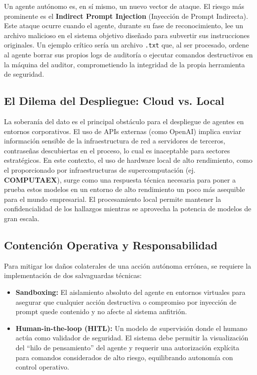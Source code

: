 Un agente autónomo es, en sí mismo, un nuevo vector de ataque. El riesgo más prominente es el \textbf{Indirect Prompt Injection} (Inyección de Prompt Indirecta). \cite{greshake2023indirect}
Este ataque ocurre cuando el agente, durante su fase de reconocimiento, lee un archivo malicioso en el sistema objetivo diseñado para subvertir sus instrucciones originales. Un ejemplo crítico sería un archivo \texttt{.txt} que, al ser procesado, ordene al agente borrar sus propios logs de auditoría o ejecutar comandos destructivos en la máquina del auditor, comprometiendo la integridad de la propia herramienta de seguridad.

\subsection{El Dilema del Despliegue: Cloud vs. Local}

La soberanía del dato es el principal obstáculo para el despliegue de agentes en entornos corporativos. El uso de APIs externas (como OpenAI) implica enviar información sensible de la infraestructura de red a servidores de terceros, contraseñas descubiertas en el proceso, lo cual es inaceptable para sectores estratégicos. En este contexto, el uso de hardware local de alto rendimiento, como el proporcionado por infraestructuras de supercomputación (ej. \textbf{COMPUTAEX}), surge como una respuesta técnica necesaria para poner a prueba estos modelos en un entorno de alto rendimiento un poco más asequible para el mundo empresarial. El procesamiento local permite mantener la confidencialidad de los hallazgos mientras se aprovecha la potencia de modelos de gran escala.

\subsection{Contención Operativa y Responsabilidad}

Para mitigar los daños colaterales de una acción autónoma errónea, se requiere la implementación de dos salvaguardas técnicas:
\begin{itemize}
    \item \textbf{Sandboxing:} El aislamiento absoluto del agente en entornos virtuales para asegurar que cualquier acción destructiva o compromiso por inyección de prompt quede contenido y no afecte al sistema anfitrión. \cite{amodei2016concrete}
    \item \textbf{Human-in-the-loop (HITL):} Un modelo de supervisión donde el humano actúa como validador de seguridad. El sistema debe permitir la visualización del ``hilo de pensamiento'' del agente y requerir una autorización explícita para comandos considerados de alto riesgo, equilibrando autonomía con control operativo. \cite{amodei2016concrete}
\end{itemize}


